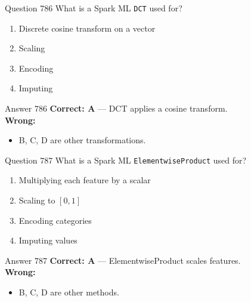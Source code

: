 \documentclass[aspectratio=169,11pt]{beamer}
\begin{document}
	\begin{frame}{Question 786}
		What is a Spark ML \texttt{DCT} used for?
		\begin{enumerate}[label=\Alph*.]
			\item Discrete cosine transform on a vector
			\item Scaling
			\item Encoding
			\item Imputing
		\end{enumerate}
	\end{frame}
	\begin{frame}{Answer 786}
		\textbf{Correct: A} --- DCT applies a cosine transform.\\
		\vspace{0.5em}
		\textbf{Wrong:}
		\begin{itemize}
			\item B, C, D are other transformations.
		\end{itemize}
	\end{frame}
	
	\begin{frame}{Question 787}
		What is a Spark ML \texttt{ElementwiseProduct} used for?
		\begin{enumerate}[label=\Alph*.]
			\item Multiplying each feature by a scalar
			\item Scaling to $[0,1]$
			\item Encoding categories
			\item Imputing values
		\end{enumerate}
	\end{frame}
	\begin{frame}{Answer 787}
		\textbf{Correct: A} --- ElementwiseProduct scales features.\\
		\vspace{0.5em}
		\textbf{Wrong:}
		\begin{itemize}
			\item B, C, D are other methods.
		\end{itemize}
	\end{frame}
	
\end{document}
